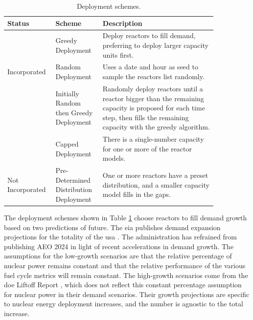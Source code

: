 \begin{table}[H]
    \centering
    \caption{Deployment schemes.}
    \label{tab:deployment_schemes}
    \begin{tabular}{p{0.15\linewidth} >{\raggedright}p{0.20\linewidth}>{\raggedright\arraybackslash}p{0.50\linewidth}}
        \hline
        Status & Scheme & Description \\
        \hline
        & Greedy Deployment & Deploy reactors to fill demand, preferring to deploy larger capacity units first. \\
        Incorporated & Random Deployment & Uses a date and hour as seed to sample the
        reactors list randomly. \\
        & Initially Random then Greedy Deployment & Randomly deploy reactors until
        a reactor bigger than the remaining capacity is proposed for each time step,
        then fills the remaining capacity with the greedy algorithm. \\
        \hline
         & Capped Deployment & There is a
        single-number capacity for one or more of the reactor models. \\
        Not Incorporated & Pre-Determined Distribution Deployment & One or more reactors have a
        preset distribution, and a smaller capacity model fills in the gaps. \\
        \hline
    \end{tabular}
\end{table}

The deployment schemes shown in Table \ref{tab:deployment_schemes} choose reactors to fill demand growth based on two predictions of future. The \gls{eia} publishes demand expansion projections for the totality of the \gls{usa} \cite{eia_aeo_2023}. The administration has refrained from publishing AEO 2024 in light of recent accelerations in demand growth. The assumptions for the low-growth scenarios are that the relative percentage of nuclear power remains constant and that the relative performance of the various fuel cycle metrics will remain constant. The high-growth scenarios come from the \gls{doe} Liftoff Report \cite{julie_liftoff_pathways_2024}, which does not reflect this constant percentage assumption for nuclear power in their demand scenarios. Their growth projections are specific to nuclear energy deployment increases, and the number is agnostic to the total increase.

